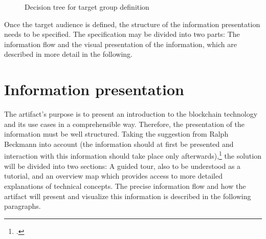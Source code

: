 \begin{figure}
    \centering
    
    \caption{Decision tree for target group definition}
    \label{fig:TargetGroup}
\end{figure}

Once the target audience is defined, the structure of the information presentation needs to be specified. The specification may be divided into two parts: The information flow and the visual presentation of the information, which are described in more detail in the following.

\section{Information presentation} \label{sec:InformationPresentation}
The artifact's purpose is to present an introduction to the blockchain technology and its use cases in a comprehensible way. Therefore, the presentation of the information must be well structured. Taking the suggestion from Ralph Beckmann into account (the information should at first be presented and interaction with this information should take place only afterwards),\footcite[Cf.][P115]{RalphBeckmann_Interview} the solution will be divided into two sections: A guided tour, also to be understood as a tutorial, and an overview map which provides access to more detailed explanations of technical concepts. The precise information flow and how the artifact will present and visualize this information is described in the following paragraphs.


